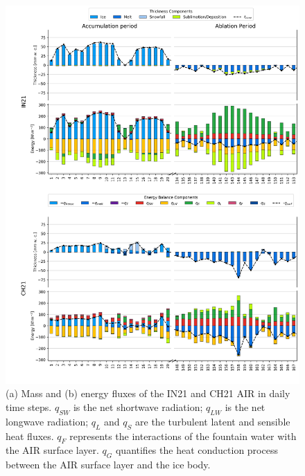 \documentclass[utf8]{frontiersSCNS} %
\begin{document}
\begin{figure} \begin{center} \includegraphics[width=\linewidth]{Figures/mass_energy_bal.jpg} \end{center}
\caption{(a) Mass and (b) energy fluxes of the IN21 and CH21 AIR in daily time steps.  $q_{SW}$ is the
    net shortwave radiation; $q_{LW}$ is the net longwave radiation; $q_{L}$ and $q_{S}$ are the turbulent latent and
    sensible heat fluxes. $q_{F}$ represents the interactions of the fountain water with the AIR surface layer.  $q_{G}$
    quantifies the heat conduction process between the AIR surface layer and the ice body. } \label{fig:MEB} \end{figure}
\end{document}
